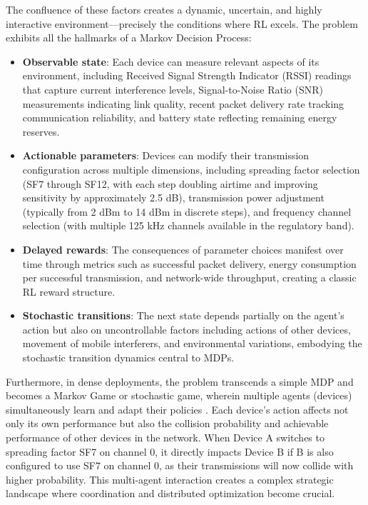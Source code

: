 \documentclass[12pt,a4paper]{article}
\begin{document}
The confluence of these factors creates a dynamic, uncertain, and highly interactive environment—precisely the conditions where RL excels. The problem exhibits all the hallmarks of a Markov Decision Process:
\begin{itemize}
    \item \textbf{Observable state}: Each device can measure relevant aspects of its environment, including Received Signal Strength Indicator (RSSI) readings that capture current interference levels, Signal-to-Noise Ratio (SNR) measurements indicating link quality, recent packet delivery rate tracking communication reliability, and battery state reflecting remaining energy reserves.
    
    \item \textbf{Actionable parameters}: Devices can modify their transmission configuration across multiple dimensions, including spreading factor selection (SF7 through SF12, with each step doubling airtime and improving sensitivity by approximately 2.5 dB), transmission power adjustment (typically from 2 dBm to 14 dBm in discrete steps), and frequency channel selection (with multiple 125 kHz channels available in the regulatory band).
    
    \item \textbf{Delayed rewards}: The consequences of parameter choices manifest over time through metrics such as successful packet delivery, energy consumption per successful transmission, and network-wide throughput, creating a classic RL reward structure.
    
    \item \textbf{Stochastic transitions}: The next state depends partially on the agent's action but also on uncontrollable factors including actions of other devices, movement of mobile interferers, and environmental variations, embodying the stochastic transition dynamics central to MDPs.
\end{itemize}

Furthermore, in dense deployments, the problem transcends a simple MDP and becomes a Markov Game or stochastic game, wherein multiple agents (devices) simultaneously learn and adapt their policies \cite{littman1994markov}. Each device's action affects not only its own performance but also the collision probability and achievable performance of other devices in the network. When Device A switches to spreading factor SF7 on channel 0, it directly impacts Device B if B is also configured to use SF7 on channel 0, as their transmissions will now collide with higher probability. This multi-agent interaction creates a complex strategic landscape where coordination and distributed optimization become crucial.
\end{document}
